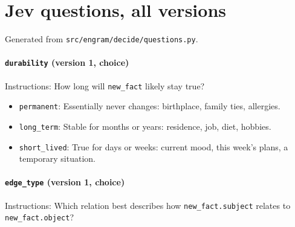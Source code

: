 \documentclass[11pt]{article}
\begin{document}
\section{Jev questions, all versions}
Generated from \texttt{src/engram/decide/questions.py}.

\paragraph{\texttt{durability} (version 1, choice)}
Instructions: How long will \texttt{new\_\allowbreak{}fact} likely stay true?

\begin{itemize}
\item \texttt{permanent}: Essentially never changes: birthplace, family ties, allergies.
\item \texttt{long\_\allowbreak{}term}: Stable for months or years: residence, job, diet, hobbies.
\item \texttt{short\_\allowbreak{}lived}: True for days or weeks: current mood, this week's plans, a temporary situation.
\end{itemize}
\paragraph{\texttt{edge\_\allowbreak{}type} (version 1, choice)}
Instructions: Which relation best describes how \texttt{new\_\allowbreak{}fact.subject} relates to \texttt{new\_\allowbreak{}fact.object}?
\end{document}
